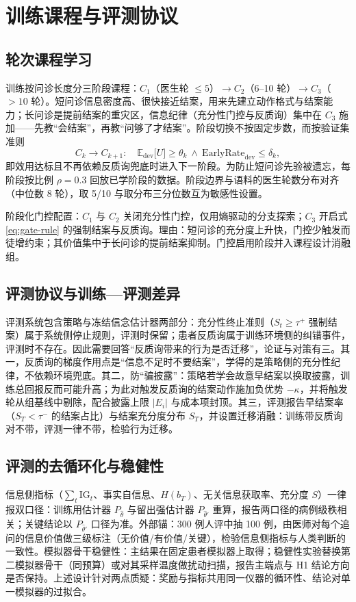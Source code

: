 \documentclass[11pt,a4paper]{ctexart}
\newcommand{\E}{\mathbb{E}}
\newcommand{\1}[1]{\mathbb{1}\!\left[#1\right]}
\newcommand{\IG}{\mathrm{IG}}
\begin{document}
\section{训练课程与评测协议}

\subsection{轮次课程学习}
训练按问诊长度分三阶段课程：$C_1$（医生轮 $\le5$）$\to C_2$（6--10 轮）$\to C_3$（$>10$ 轮）。短问诊信息密度高、很快接近结案，用来先建立动作格式与结案能力；长问诊是提前结案的重灾区，信息纪律（充分性门控与反质询）集中在 $C_3$ 施加——先教``会结案''，再教``问够了才结案''。阶段切换不按固定步数，而按验证集准则
\begin{equation}\label{eq:curriculum}
C_k\to C_{k+1}:\quad
\E_{\mathrm{dev}}\bigl[U\bigr]\ge\theta_k
\ \wedge\
\mathrm{EarlyRate}_{\mathrm{dev}}\le\delta_k,
\end{equation}
即效用达标且不再依赖反质询兜底时进入下一阶段。为防止短问诊先验被遗忘，每阶段按比例 $\rho=0.3$ 回放已学阶段的数据。阶段边界与语料的医生轮数分布对齐（中位数 8 轮），取 5/10 与取分布三分位数互为敏感性设置。

阶段化门控配置：$C_1$ 与 $C_2$ 关闭充分性门控，仅用熵驱动的分支探索；$C_3$ 开启式 \eqref{eq:gate-rule} 的强制结案与反质询。理由：短问诊的充分度上升快，门控少触发而徒增约束；其价值集中于长问诊的提前结案抑制。门控启用阶段并入课程设计消融组。

\subsection{评测协议与训练—评测差异}
评测系统包含策略与冻结信念估计器两部分：充分性终止准则（$S_t\ge\tau^+$ 强制结案）属于系统侧停止规则，评测时保留；患者反质询属于训练环境侧的纠错事件，评测时不存在。因此需要回答``反质询带来的行为是否迁移''，论证与对策有三。其一，反质询的梯度作用点是``信息不足时不要结案''，学得的是策略侧的充分性纪律，不依赖环境兜底。其二，防``骗披露''：策略若学会故意早结案以换取披露，训练总回报反而可能升高；为此对触发反质询的结案动作施加负优势 $-\kappa$，并将触发轮从组基线中剔除，配合披露上限 $|E_i|$ 与成本项封顶。其三，评测报告早结案率（$S_T<\tau^-$ 的结案占比）与结案充分度分布 $S_T$，并设置迁移消融：训练带反质询对不带，评测一律不带，检验行为迁移。

\subsection{评测的去循环化与稳健性}
信息侧指标（$\sum_t\IG_t$、事实自信息、$H(b_T)$、无关信息获取率、充分度 $S$）一律报双口径：训练用估计器 $P_{\hat\theta}$ 与留出强估计器 $P_{\hat\theta'}$ 重算，报告两口径的病例级秩相关；关键结论以 $P_{\hat\theta'}$ 口径为准。外部锚：300 例人评中抽 100 例，由医师对每个追问的信息价值做三级标注（无价值/有价值/关键），检验信息侧指标与人类判断的一致性。模拟器骨干稳健性：主结果在固定患者模拟器上取得；稳健性实验替换第二模拟器骨干（同预算）或对其采样温度做扰动扫描，报告主端点与 H1 结论方向是否保持。上述设计针对两点质疑：奖励与指标共用同一仪器的循环性、结论对单一模拟器的过拟合。
\end{document}
